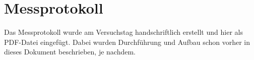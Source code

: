 

\def\skalierung{0.65}

\chapter{Messprotokoll}
\label{chap:protokoll}

Das Messprotokoll wurde am Versuchstag handschriftlich erstellt und hier als
PDF-Datei eingefügt. Dabei wurden Durchführung und Aufbau schon vorher in dieses
Dokument beschrieben, je nachdem.

%
%
